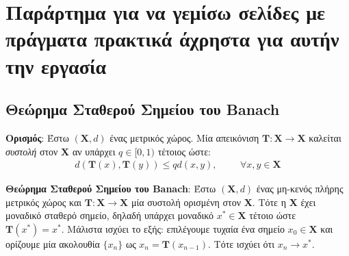 \documentclass[11pt]{article} %
\numberwithin{equation}{subsection}
\begin{document}
\section{Παράρτημα για να γεμίσω σελίδες με πράγματα πρακτικά άχρηστα για αυτήν την εργασία}

\subsection{Θεώρημα Σταθερού Σημείου του Banach}

\textbf{Ορισμός}: Έστω $(\textbf{X}, d)$ ένας μετρικός χώρος. Μία απεικόνιση $\textbf{T}: \textbf{X} \rightarrow \textbf{X}$ καλείται \textit{συστολή} στον \textbf{X} αν υπάρχει $q \in [0, 1)$ τέτοιος ώστε:
\begin{align*}
d(\textbf{T}(x), \textbf{T}(y)) \leq q d(x, y), \hspace{1cm} \forall  x,y \in \textbf{X}
\end{align*}

\textbf{Θεώρημα Σταθερού Σημείου του Banach}: Έστω $(\textbf{X}, d)$ ένας μη-κενός πλήρης μετρικός χώρος και $\textbf{T}: \textbf{X} \rightarrow \textbf{X}$ μία συστολή ορισμένη στον \textbf{X}. Τότε η \textbf{X} έχει μοναδικό σταθερό σημείο, δηλαδή υπάρχει μοναδικό $x^* \in \textbf{X}$ τέτοιο ώστε $\textbf{T}(x^*) = x^*$. Μάλιστα ισχύει το εξής: επιλέγουμε τυχαία ένα σημείο $x_0 \in \textbf{X}$ και ορίζουμε μία ακολουθία $\{x_n\}$ ως $x_n = \textbf{T}(x_{n - 1})$. Τότε ισχύει ότι $x_n \rightarrow x^*$.























 
\end{document}
